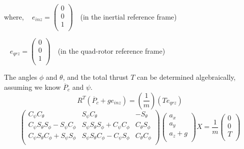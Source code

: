 where,
\mbox{ } \hspace{.5in} $ e_{inz} = \left( \begin{array}{c}
0\\0\\1\\
\end{array}\right) \text{  }$ (in the inertial reference frame)

\mbox{ } \hspace{.5in} $ e_{qrz} = \left( \begin{array}{c}
0\\0\\1\\
\end{array}\right) \text{  }$  (in the quad-rotor reference frame)

The angles $\phi$ and $\theta$, and the total thrust $T$ can be determined algebraically, assuming we know $\ddot{P_c}$ and $\psi$.\\

\begin{equation}
    \label{eq:thrustTransformation}
    R^T \left( \ddot{P_c} + g e_{inz}\right) = \left(\frac{1}{m}\right) \left(T e_{qrz}\right)
\end{equation}
\begin{equation}
    \left( \begin{array}{ccc}
        C_{\psi} C_{\theta} & S_{\psi} C_{\theta} & -S_{\theta}\\
        C_{\psi} S_{\theta} S_{\phi} - S_{\psi} C_{\phi} & S_{\psi} S_{\theta} S_{\phi} + C_{\psi} C_{\phi} & C_{\theta} S_{\phi}\\
        C_{\psi} S_{\theta} C_{\phi} + S_{\psi} S_{\phi} & S_{\psi} S_{\theta} C_{\phi} - C_{\psi} S_{\phi} & C_{\theta} C_{\phi}\\
    \end{array} \right)\left( \begin{array}{c} a_x\\a_y\\a_z+g\\\end{array} \right)X
    = \frac{1}{m} \left( \begin{array}{c} 0\\0\\T\\ \end{array} \right)
\end{equation}

